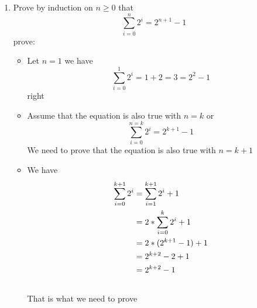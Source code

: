 \documentclass[11pt]{article}
\begin{document}
\begin {enumerate}
\item Prove by induction on $n \geq 0$ that 
$$\sum_{i=0}^n2^i = 2^{n+1} - 1$$
prove:
\begin{itemize}
  \item Let $n=1$ we have $$\sum_{i=0}^{1}2^i=1+2=3=2^{2}-1$$ right
  \item Assume that the equation is also true with $n=k$ or
    $$\sum_{i=0}^{n=k}2^i = 2^{k+1}-1$$
    We need to prove that the equation is also true with $n=k+1$
  \item We have
    \begin{align}
      \sum_{i=0}^{k+1}2^i &= \sum_{i=1}^{k+1}2^i + 1 \\ \notag
      &= 2*\sum_{i=0}^{k}2^i + 1 \\ \notag
      &= 2*(2^{k+1}-1) + 1 \\ \notag
      &= 2^{k+2} - 2 + 1 \\ \notag
      &= 2^{k+2} - 1 \\ \notag
    \end{align}
    That is what we need to prove
\end{itemize}

\end {enumerate}
\end{document}
